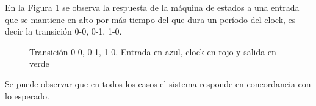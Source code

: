 En la Figura \ref{fig:GRAPH2} se observa la respuesta de la m\'aquina de estados a una entrada que se mantiene en alto por m\'as tiempo del que dura un per\'iodo del clock, es decir la transici\'on 0-0, 0-1, 1-0.
\begin{figure}[H]
    \centering
    \caption{Transici\'on 0-0, 0-1, 1-0. Entrada en azul, clock en rojo y salida en verde}
    \label{fig:GRAPH2}
\end{figure}

Se puede observar que en todos los casos el sistema responde en concordancia con lo esperado.

